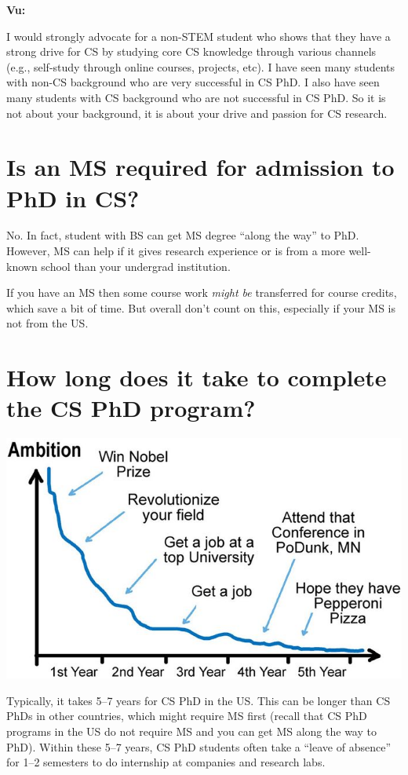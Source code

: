 \documentclass[oneside,11pt]{memoir}
\newenvironment{commentbox}[1][]{
  \small
  \begin{mybox}
    {\small \textbf{#1}}
  }{
  \end{mybox}
}
\begin{document}
\begin{commentbox}[Vu:]
  I would strongly advocate for a non-STEM student who shows that they have a strong drive for CS by studying core CS knowledge through various channels (e.g., self-study through online courses, projects, etc).  I have seen many students with non-CS background who are very successful in CS PhD.  I also have seen many students with CS background who are not successful in CS PhD.  So it is not about your background, it is about your drive and passion for CS research.
\end{commentbox}

\section{Is an MS required for admission to PhD in CS?}\label{sec:msrequirement}
No. In fact, student with BS can get MS degree ``along the way'' to PhD.  However, MS can help if it gives research experience or is from a more well-known school than your undergrad institution. 

If you have an MS then some course work \emph{might be} transferred for course credits, which save a bit of time. But overall don't count on this, especially if your MS is not from the US. 


\section{How long does it take to complete the CS PhD program?}\label{sec:time}


\begin{center}
  \includegraphics[scale=0.3]{files/c4a.png}
\end{center}


Typically, it takes 5--7 years for CS PhD in the US.  This can be longer than CS PhDs in other countries, which might require MS first (recall that CS PhD programs in the US do not require MS and you can get MS along the way to PhD). Within these 5--7 years, CS PhD students often take a ``leave of absence'' for 1--2 semesters to do internship at companies and research labs.
\end{document}
